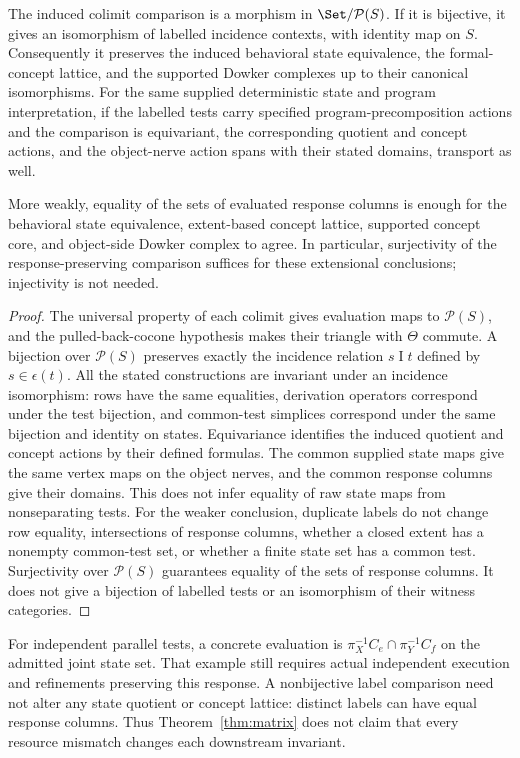 \begin{proposition}\label{prop:slice}
The induced colimit comparison is a morphism in $\Set/\mathcal P(S)$.
If it is bijective, it gives an isomorphism of labelled incidence contexts,
with identity map on $S$. Consequently it preserves the induced behavioral
state equivalence, the formal-concept lattice, and the supported Dowker
complexes up to their canonical isomorphisms. For the same supplied deterministic state and program interpretation, if the
labelled tests carry specified program-precomposition actions and the
comparison is equivariant, the corresponding quotient and concept actions,
and the object-nerve action spans with their stated domains, transport as well.

More weakly, equality of the sets of evaluated response columns is enough
for the behavioral state equivalence, extent-based concept lattice,
supported concept core, and object-side Dowker complex to agree. In
particular, surjectivity of the response-preserving comparison suffices
for these extensional conclusions; injectivity is not needed.
\end{proposition}
\begin{proof}
The universal property of each colimit gives evaluation maps to
$\mathcal P(S)$, and the pulled-back-cocone hypothesis makes their triangle
with $\Theta$ commute. A bijection over $\mathcal P(S)$ preserves exactly
the incidence relation $s\mathrel I t$ defined by $s\in\epsilon(t)$.
All the stated constructions are invariant under an incidence isomorphism:
rows have the same equalities, derivation operators correspond under the
test bijection, and common-test simplices correspond under the same
bijection and identity on states. Equivariance identifies the induced quotient and concept actions by their
defined formulas. The common supplied state maps give the same vertex maps
on the object nerves, and the common response columns give their domains.
This does not infer equality of raw state maps from nonseparating tests.
For the weaker conclusion, duplicate labels do not change row equality,
intersections of response columns, whether a closed extent has a
nonempty common-test set, or whether a finite state set has a common
test. Surjectivity over $\mathcal P(S)$ guarantees equality of the
sets of response columns. It does not give a bijection of labelled tests
or an isomorphism of their witness categories.
\end{proof}

For independent parallel tests, a concrete evaluation is
$\pi_X^{-1}C_e\cap\pi_Y^{-1}C_f$ on the admitted joint state set.
That example still requires actual independent execution and refinements
preserving this response. A nonbijective label comparison need not alter
any state quotient or concept lattice: distinct labels can have equal
response columns. Thus Theorem~\ref{thm:matrix} does not claim that every
resource mismatch changes each downstream invariant.

